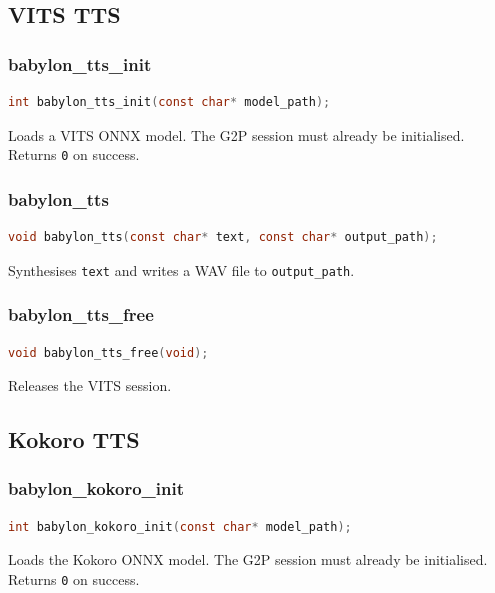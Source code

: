 \documentclass[12pt,a4paper]{article}
\begin{document}
\subsection{VITS TTS}

\subsubsection{babylon\_tts\_init}

\begin{lstlisting}[language=c]
int babylon_tts_init(const char* model_path);
\end{lstlisting}

Loads a VITS ONNX model. The G2P session must already be initialised. Returns \texttt{0} on success.

\subsubsection{babylon\_tts}

\begin{lstlisting}[language=c]
void babylon_tts(const char* text, const char* output_path);
\end{lstlisting}

Synthesises \texttt{text} and writes a WAV file to \texttt{output\_path}.

\subsubsection{babylon\_tts\_free}

\begin{lstlisting}[language=c]
void babylon_tts_free(void);
\end{lstlisting}

Releases the VITS session.

\subsection{Kokoro TTS}

\subsubsection{babylon\_kokoro\_init}

\begin{lstlisting}[language=c]
int babylon_kokoro_init(const char* model_path);
\end{lstlisting}

Loads the Kokoro ONNX model. The G2P session must already be initialised. Returns \texttt{0} on success.
\end{document}
